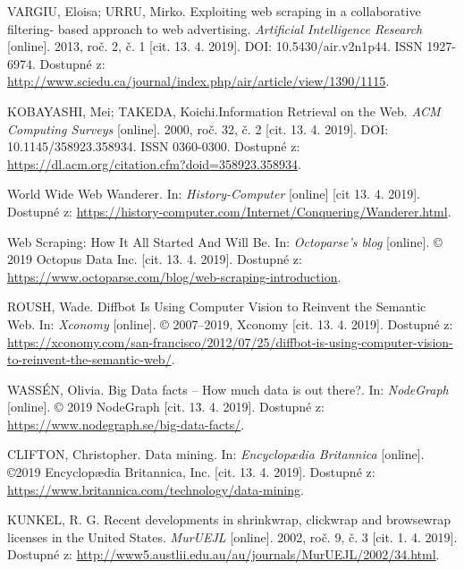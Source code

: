 \documentclass[thesis=B,czech]{FITthesis}[2012/06/26]
\begin{document}

\begin{thebibliography}{99}
	VARGIU, Eloisa; URRU, Mirko. Exploiting web scraping in a collaborative filtering- based approach to web advertising. \textit{Artificial Intelligence Research} [online]. 2013, roč. 2, č. 1 [cit. 13. 4. 2019]. DOI: 10.5430/air.v2n1p44. ISSN 1927-6974. Dostupné z: \url{http://www.sciedu.ca/journal/index.php/air/article/view/1390/1115}.
	
	KOBAYASHI, Mei; TAKEDA, Koichi.Information Retrieval on the Web. \textit{ACM Computing Surveys} [online]. 2000, roč. 32, č. 2 [cit. 13. 4. 2019]. DOI: 10.1145/358923.358934. ISSN 0360-0300. Dostupné z: \url{https://dl.acm.org/citation.cfm?doid=358923.358934}.
	
	World Wide Web Wanderer. In: \textit{History-Computer} [online] [cit 13. 4. 2019]. Dostupné z: \url{https://history-computer.com/Internet/Conquering/Wanderer.html}.
	
	Web Scraping: How It All Started And Will Be. In: \textit{Octoparse's blog} [online]. © 2019 Octopus Data Inc. [cit. 13. 4. 2019]. Dostupné z: \url{https://www.octoparse.com/blog/web-scraping-introduction}.
	
	ROUSH, Wade. Diffbot Is Using Computer Vision to Reinvent the Semantic Web. In: \textit{Xconomy} [online]. © 2007--2019, Xconomy [cit. 13. 4. 2019]. Dostupné z: \url{https://xconomy.com/san-francisco/2012/07/25/diffbot-is-using-computer-vision-to-reinvent-the-semantic-web/}.
	
	WASSÉN, Olivia. Big Data facts – How much data is out there?. In: \textit{NodeGraph} [online]. © 2019 NodeGraph [cit. 13. 4. 2019]. Dostupné z: \url{https://www.nodegraph.se/big-data-facts/}.
	
	CLIFTON, Christopher. Data mining. In: \textit{Encyclopædia Britannica} [online]. ©2019 Encyclopædia Britannica, Inc. [cit. 13. 4. 2019]. Dostupné z: \url{https://www.britannica.com/technology/data-mining}.
	
	KUNKEL, R. G. Recent developments in shrinkwrap, clickwrap and browsewrap licenses in the United States. \textit{MurUEJL} [online]. 2002, roč. 9, č. 3 [cit. 1. 4. 2019]. Dostupné z: \url{http://www5.austlii.edu.au/au/journals/MurUEJL/2002/34.html}.
	

\end{thebibliography}
\end{document}
